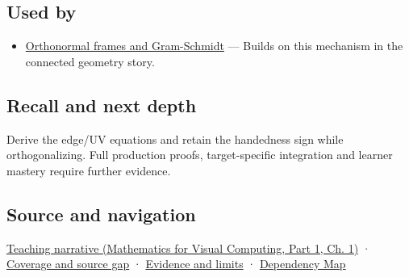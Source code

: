 \subsection{Used by}\label{appendix-e31893dec985-used-by}

\hypertarget{appendix-e31893dec985-used-by}{}

\begin{itemize}
\tightlist
\item
  \hyperref[appendix-c39f1ed34271]{Orthonormal frames and Gram-Schmidt} --- Builds on this mechanism in the connected geometry story.
\end{itemize}

\subsection{Recall and next depth}\label{appendix-e31893dec985-recall-and-next-depth}

\hypertarget{appendix-e31893dec985-recall-and-next-depth}{}

Derive the edge/UV equations and retain the handedness sign while orthogonalizing. Full production proofs, target-specific integration and learner mastery require further evidence.

\subsection{Source and navigation}\label{appendix-e31893dec985-source-and-navigation}

\hypertarget{appendix-e31893dec985-source-and-navigation}{}

\href{../02-Mathematics-for-Visual-Computing-P01/main.pdf\#01-foundations-i-ch017-surface-movement-becomes-a-local-frame}{Teaching narrative (Mathematics for Visual Computing, Part 1, Ch. 1)} · \hyperref[appendix-fd090d982a15-phase-6---parts-501-600]{Coverage and source gap} · \hyperref[appendix-a103e7846d21-phase-6---source-analysis-and-verification]{Evidence and limits} · \hyperref[appendix-4ad47bdd269a]{Dependency Map}
